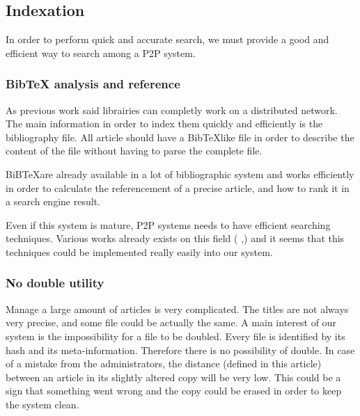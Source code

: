 \subsection{Indexation}

In order to perform quick and accurate search, we must provide a good and efficient
way to search among a P2P system.

\subsubsection{Bib\TeX{} analysis and reference}

As previous work said \cite{Lawrence99digitallibraries} librairies
can completly work on a distributed network. The main information in order
to index them quickly and efficiently is the bibliography file. All article should
have a Bib\TeX like file in order to describe the content of the file without having
to parse the complete file.

BiB\TeX are already available in a lot of bibliographic system and works efficiently
in order to calculate the referencement of a precise article, and how to rank it in 
a search engine result.

Even if this system is mature, P2P systems needs to 
have efficient searching techniques. Various works already exists on this 
field (\cite{Reynolds_efficientpeer-to-peer} ,\cite{Yang02improvingsearch})
and it seems that this techniques could be implemented really easily 
into our system.

\subsubsection{No double utility}

Manage a large amount of articles is very complicated. The titles
are not always very precise, and some file could be actually the same.
A main interest of our system is the impossibility for a 
file to be doubled. Every file is identified by its hash and its
meta-information. Therefore there is no possibility of double. In
case of a mistake from the administrators, the distance (defined in
this article) between
an article in its slightly altered copy will be very low. This could
be a sign that something went wrong and the copy could be erased in
order to keep the system clean.
